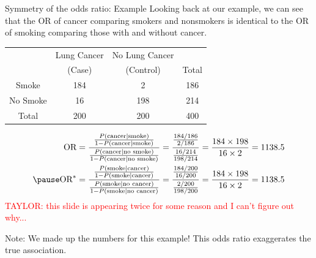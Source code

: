 \documentclass[10pt,t]{beamer}
\begin{document}
\begin{frame}{Symmetry of the odds ratio: Example}
	\vspace{-0.8cm}
	Looking back at our example, we can see that the OR of cancer comparing smokers and nonsmokers is identical to the OR of smoking comparing those with and without cancer. 
	\begin{center}
		\begin{table}
			\begin{tabular}{|c|cc|c|}
				\hline 
				& Lung Cancer & No Lung Cancer &  \\ 
				& (Case) & (Control) & Total  \\
				\hline 
				Smoke & 184 & 2  & 186 \\ 
				No Smoke & 16 & 198 & 214  \\ 
				\hline 
				Total & 200 & 200 & 400 \\ 
				\hline 
			\end{tabular}
		\end{table}\pause
	\end{center}
	\begin{align*}
		\text{OR} = \frac{\frac{P(\text{cancer} \mid \text{smoke})}{1 - P(\text{cancer} \mid \text{smoke})}}{\frac{P(\text{cancer} \mid \text{no smoke})}{1 - P(\text{cancer} \mid \text{no smoke})}}  = \frac{\frac{184/186}{2/186}}{\frac{16/214}{198/214}} = \frac{184\times 198}{16 \times 2} = 1138.5\\ \pause
		\text{OR}^* =\frac{\frac{P(\text{smoke} \mid \text{cancer})}{1 - P(\text{smoke} \mid \text{cancer})}}{\frac{P(\text{smoke} \mid \text{no cancer})}{1 - P(\text{smoke} \mid \text{no cancer})}}  = \frac{\frac{184/200}{16/200}}{\frac{2/200}{198/200}} = \frac{184\times 198}{16 \times 2} = 1138.5
	\end{align*}
\vfill \textcolor{red}{TAYLOR: this slide is appearing twice for some reason and I can't figure out why...}
\begin{tiny}Note: We made up the numbers for this example! This odds ratio exaggerates the true association.\end{tiny}

\end{frame}
\end{document}
